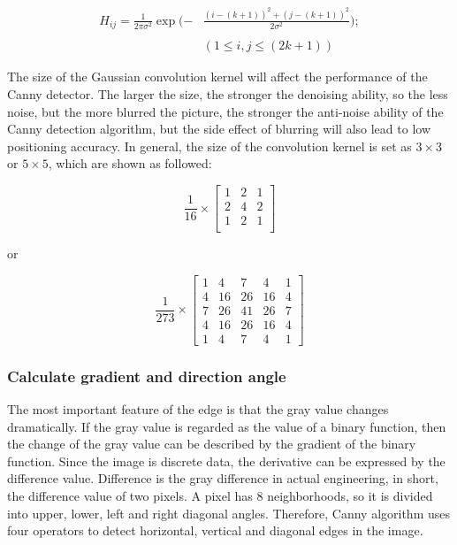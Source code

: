 \documentclass[review]{cvpr}
\begin{document}
\begin{equation}
\begin{split}
	H_{i j}=\frac{1}{2 \pi \sigma^{2}} \exp (-&\frac{(i-(k+1))^{2}+(j-(k+1))^{2}}{2 \sigma^{2}}); \\ \\
	& (1 \leq i, j \leq(2 k+1))
\end{split}
\end{equation}

The size of the Gaussian convolution kernel will affect the performance of the Canny detector. The larger the size, the stronger the denoising ability, so the less noise, but the more blurred the picture, the stronger the anti-noise ability of the Canny detection algorithm, but the side effect of blurring will also lead to low positioning accuracy. In general, the size of the convolution kernel is set as $3\times 3$ or $5 \times 5$, which are shown as followed:

$$
\frac{1}{16} \times\left[\begin{array}{ccc}
1 & 2 & 1\\
2 & 4 & 2 \\
1 & 2 & 1\\
\end{array}\right]
$$

or

$$
\frac{1}{273} \times\left[\begin{array}{ccccc}
1 & 4 & 7 & 4 & 1 \\
4 & 16 & 26 & 16 & 4 \\
7 & 26 & 41 & 26 & 7 \\
4 & 16 & 26 & 16 & 4 \\
1 & 4 & 7 & 4 & 1
\end{array}\right]
$$

\subsubsection{Calculate gradient and direction angle}
The most important feature of the edge is that the gray value changes dramatically. If the gray value is regarded as the value of a binary function, then the change of the gray value can be described by the gradient of the binary function. Since the image is discrete data, the derivative can be expressed by the difference value. Difference is the gray difference in actual engineering, in short, the difference value of two pixels. A pixel has 8 neighborhoods, so it is divided into upper, lower, left and right diagonal angles. Therefore, Canny algorithm uses four operators to detect horizontal, vertical and diagonal edges in the image.
\end{document}
